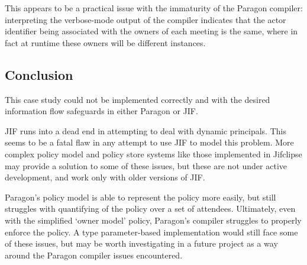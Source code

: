 This appears to be a practical issue with the immaturity of the Paragon compiler: interpreting the verbose-mode output of the compiler indicates that the actor identifier being associated with the owners of each meeting is the same, where in fact at runtime these owners will be different instances.

\subsection{Conclusion}

This case study could not be implemented correctly and with the desired information flow safeguards in either Paragon or JIF.

JIF runs into a dead end in attempting to deal with dynamic principals. This seems to be a fatal flaw in any attempt to use JIF to model this problem. More complex policy model and policy store systems like those implemented in Jifclipse \cite{hicks2007jifclipse} may provide a solution to some of these issues, but these are not under active development, and work only with older versions of JIF.

Paragon's policy model is able to represent the policy more easily, but still struggles with quantifying of the policy over a set of attendees. Ultimately, even with the simplified `owner model' policy, Paragon's compiler struggles to properly enforce the policy. A type parameter-based implementation would still face some of these issues, but may be worth investigating in a future project as a way around the Paragon compiler issues encountered.